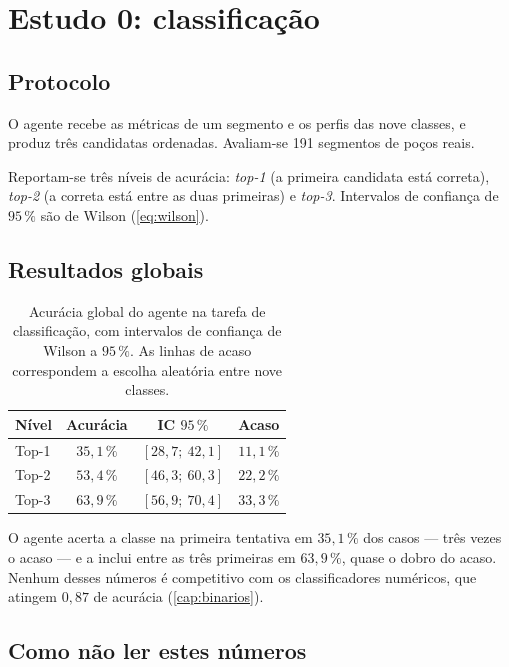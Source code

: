 \section{Estudo 0: classificação}

\subsection{Protocolo}

O agente recebe as métricas de um segmento e os perfis das nove classes, e produz três
candidatas ordenadas. Avaliam-se 191 segmentos de poços reais.

Reportam-se três níveis de acurácia: \emph{top-1} (a primeira candidata está correta),
\emph{top-2} (a correta está entre as duas primeiras) e \emph{top-3}. Intervalos de
confiança de $95\,\%$ são de Wilson (\cref{eq:wilson}).

\subsection{Resultados globais}

\begin{table}[htbp]
\centering
\caption{Acurácia global do agente na tarefa de classificação, com intervalos de
confiança de Wilson a $95\,\%$. As linhas de acaso correspondem a escolha aleatória
entre nove classes.}
\label{tab:ag-global}
\begin{tabular}{lccc}
\toprule
\textbf{Nível} & \textbf{Acurácia} & \textbf{IC $95\,\%$} & \textbf{Acaso} \\
\midrule
Top-1 & $35{,}1\,\%$ & $[28{,}7;\ 42{,}1]$ & $11{,}1\,\%$ \\
Top-2 & $53{,}4\,\%$ & $[46{,}3;\ 60{,}3]$ & $22{,}2\,\%$ \\
Top-3 & $63{,}9\,\%$ & $[56{,}9;\ 70{,}4]$ & $33{,}3\,\%$ \\
\bottomrule
\end{tabular}
\end{table}

\begin{resultadochave}
O agente acerta a classe na primeira tentativa em $35{,}1\,\%$ dos casos --- três vezes o
acaso --- e a inclui entre as três primeiras em $63{,}9\,\%$, quase o dobro do acaso.
Nenhum desses números é competitivo com os classificadores numéricos, que atingem
$0{,}87$ de acurácia (\cref{cap:binarios}).
\end{resultadochave}

\subsection{Como não ler estes números}

